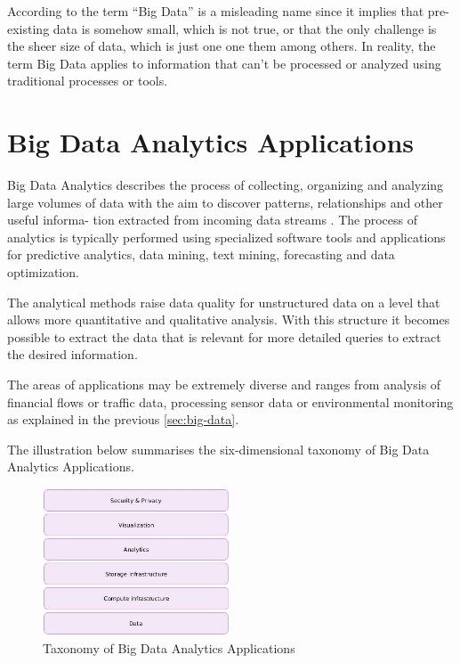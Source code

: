 According to \cite{Marz15} the term “Big Data” is a misleading name since it implies that
pre-existing data is somehow small, which is not true, or that the only challenge is the
sheer size of data, which is just one one them among others. In reality, the term Big Data
applies to information that can’t be processed or analyzed using traditional processes or
tools.

\section{Big Data Analytics Applications}
Big Data Analytics describes the process of collecting, organizing and analyzing large
volumes of data with the aim to discover patterns, relationships and other useful informa-
tion extracted from incoming data streams \cite{Marz15}. The process of analytics is typically
performed using specialized software tools and applications for predictive analytics, data
mining, text mining, forecasting and data optimization.

The analytical methods raise data quality for unstructured data on a level that allows
more quantitative and qualitative analysis. With this structure it becomes possible
to extract the data that is relevant for more detailed queries to extract the desired information.

The areas of applications may be extremely diverse and ranges from analysis of financial
flows or traffic data, processing sensor data or environmental monitoring as explained in
the previous \autoref{sec:big-data}.

The illustration below summarises the six-dimensional taxonomy \cite{Bitk14, Csa14} of Big
Data Analytics Applications.
\begin{figure}[H]
	\centering
	\includegraphics[width=0.5\textwidth]{../images/05-big-data-taxonomy.jpg}
	\caption{Taxonomy of Big Data Analytics Applications \cite{Csa14}}
	\label{img:taxonomy-bigdata-applications}
\end{figure}

